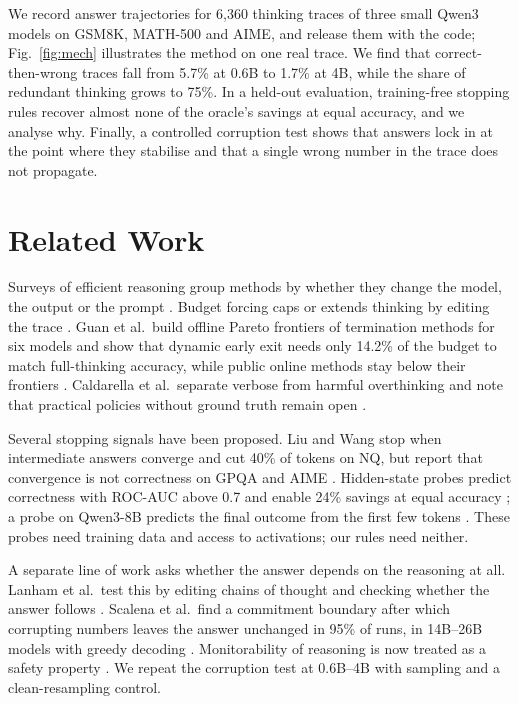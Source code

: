 \documentclass[conference]{IEEEtran}
\begin{document}
We record answer trajectories for 6{,}360 thinking traces of three small Qwen3 models on
GSM8K, MATH-500 and AIME, and release them with the code; Fig.~\ref{fig:mech} illustrates the method on one real
trace. We find that correct-then-wrong traces fall from 5.7\% at
0.6B to 1.7\% at 4B, while the share of redundant thinking grows to 75\%. In a held-out evaluation, training-free
stopping rules recover almost none of the oracle's savings at equal accuracy, and we analyse why. Finally, a
controlled corruption test shows that answers lock in at the point where they stabilise and that a single wrong number
in the trace does not propagate.

\section{Related Work}
\label{sec:related}
Surveys of efficient reasoning group methods by whether they change the model, the output or the prompt
\cite{sui2025stop}. Budget forcing caps or extends thinking by editing the trace
\cite{muennighoff2025s1}. Guan et al.\ build offline Pareto frontiers of termination methods for six models and show
that dynamic early exit needs only 14.2\% of the budget to match full-thinking accuracy, while public online methods
stay below their frontiers \cite{guan2026pareto}. Caldarella et al.\ separate verbose from harmful overthinking and note
that practical policies without ground truth remain open \cite{caldarella2026thinking}.

Several stopping signals have been proposed. Liu and Wang stop when intermediate answers converge and cut 40\% of tokens on NQ, but
report that convergence is not correctness on GPQA and AIME \cite{liu2025convergence}. Hidden-state probes predict
correctness with ROC-AUC above 0.7 and enable 24\% savings at equal accuracy \cite{zhang2025know}; a probe on Qwen3-8B
predicts the final outcome from the first few tokens \cite{david2025temporal}. These probes need training data and
access to activations; our rules need neither.

A separate line of work asks whether the answer depends on the reasoning at all. Lanham et al.\ test this by editing chains of thought and checking whether the answer follows
\cite{lanham2023faithfulness}. Scalena et al.\ find a commitment boundary after which corrupting numbers leaves the
answer unchanged in 95\% of runs, in 14B--26B models with greedy decoding \cite{scalena2026commitment}. Monitorability
of reasoning is now treated as a safety property \cite{korbak2025monitorability}. We repeat the corruption test at
0.6B--4B with sampling and a clean-resampling control.
\end{document}
